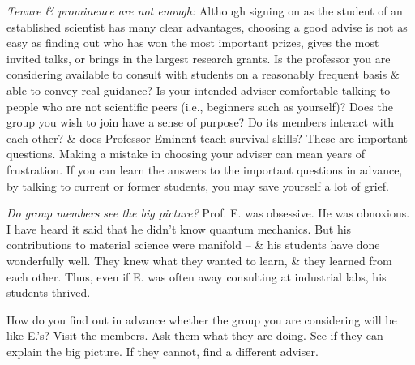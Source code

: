 \documentclass{article}
\begin{document}
\begin{enumerate}
\begin{itemize}
\begin{itemize}
			\textit{Tenure \& prominence are not enough:} Although signing on as the student of an established scientist has many clear advantages, choosing a good advise is not as easy as finding out who has won the most important prizes, gives the most invited talks, or brings in the largest research grants. Is the professor you are considering available to consult with students on a reasonably frequent basis \& able to convey real guidance? Is your intended adviser comfortable talking to people who are not scientific peers (i.e., beginners such as yourself)? Does the group you wish to join have a sense of purpose? Do its members interact with each other? \& does Professor Eminent teach survival skills? These are important questions. Making a mistake in choosing your adviser can mean years of frustration. If you can learn the answers to the important questions in advance, by talking to current or former students, you may save yourself a lot of grief.
			
			\textit{Do group members see the big picture?} Prof. E. was obsessive. He was obnoxious. I have heard it said that he didn't know quantum mechanics. But his contributions to material science were manifold -- \& his students have done wonderfully well. They knew what they wanted to learn, \& they learned from each other. Thus, even if E. was often away consulting at industrial labs, his students thrived.
			
			How do you find out in advance whether the group you are considering will be like E.'s? Visit the members. Ask them what they are doing. See if they can explain the big picture. If they cannot, find a different adviser.
			

\end{itemize}
\end{itemize}
\end{enumerate}
\end{document}
